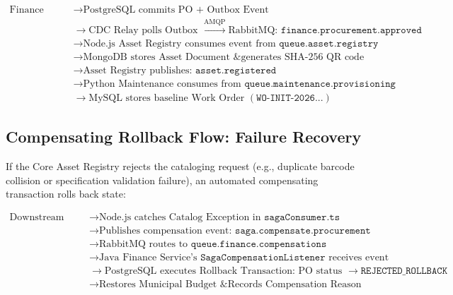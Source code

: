 \documentclass[11pt,a4paper]{article}
\begin{document}
\begin{equation}
\begin{aligned}
\text{Finance Officer Approves PO} &\longrightarrow \text{PostgreSQL commits PO + Outbox Event} \\
&\longrightarrow \text{CDC Relay polls Outbox } \xrightarrow{\text{AMQP}} \text{RabbitMQ: } \texttt{finance.procurement.approved} \\
&\longrightarrow \text{Node.js Asset Registry consumes event from } \texttt{queue.asset.registry} \\
&\longrightarrow \text{MongoDB stores Asset Document \& generates SHA-256 QR code} \\
&\longrightarrow \text{Asset Registry publishes: } \texttt{asset.registered} \\
&\longrightarrow \text{Python Maintenance consumes from } \texttt{queue.maintenance.provisioning} \\
&\longrightarrow \text{MySQL stores baseline Work Order } (\texttt{WO-INIT-2026...})
\end{aligned}
\end{equation}

\subsection{Compensating Rollback Flow: Failure Recovery}
If the Core Asset Registry rejects the cataloging request (e.g., duplicate barcode collision or specification validation failure), an automated compensating transaction rolls back state:

\begin{equation}
\begin{aligned}
\text{Downstream Rejection} &\longrightarrow \text{Node.js catches Catalog Exception in } \texttt{sagaConsumer.ts} \\
&\longrightarrow \text{Publishes compensation event: } \texttt{saga.compensate.procurement} \\
&\longrightarrow \text{RabbitMQ routes to } \texttt{queue.finance.compensations} \\
&\longrightarrow \text{Java Finance Service's } \texttt{SagaCompensationListener} \text{ receives event} \\
&\longrightarrow \text{PostgreSQL executes Rollback Transaction: PO status } \rightarrow \texttt{REJECTED\_ROLLBACK} \\
&\longrightarrow \text{Restores Municipal Budget \& Records Compensation Reason}
\end{aligned}
\end{equation}
\end{document}

